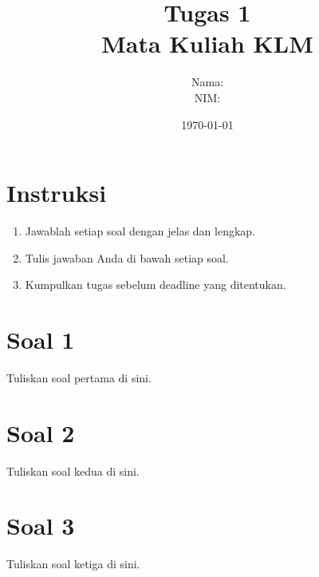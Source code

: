 \documentclass[a4paper,12pt]{article}
\title{Tugas 1 \\ \large Mata Kuliah KLM}
\author{Nama: \underline{\AuthorName} \\ NIM: \underline{\AuthorNIM}}
\date{\today}
\begin{document}
\maketitle

\section*{Instruksi}
\begin{enumerate}[label=\arabic*.]
    \item Jawablah setiap soal dengan jelas dan lengkap.
    \item Tulis jawaban Anda di bawah setiap soal.
    \item Kumpulkan tugas sebelum deadline yang ditentukan.
\end{enumerate}

\section*{Soal 1}
Tuliskan soal pertama di sini.

\vspace{3cm}

\section*{Soal 2}
Tuliskan soal kedua di sini.

\vspace{3cm}

\section*{Soal 3}
Tuliskan soal ketiga di sini.

\vspace{3cm}
\end{document}
